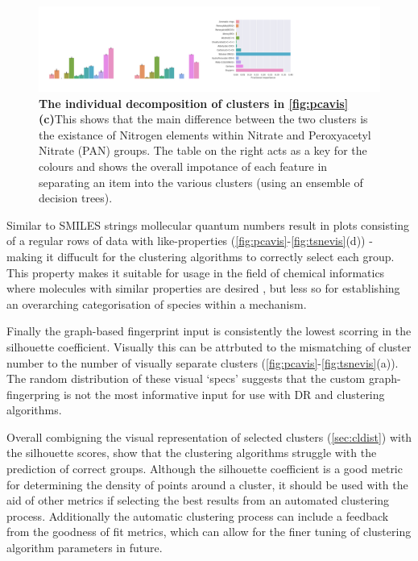\begin{figure}[H]
    \includegraphics[width=\textwidth]{outputs/PCA/maccs/group.png}
    \caption{\textbf{The individual decomposition of clusters in \autoref{fig:pcavis}(c)}This shows that the main difference between the two clusters is the existance of Nitrogen elements within Nitrate and Peroxyacetyl Nitrate (PAN) groups. The table on the right acts as a key for the colours and shows the overall impotance of each feature in separating an item into the various clusters (using an ensemble of decision trees).}
    \label{fig:maccsmath}
\end{figure}

Similar to SMILES strings mollecular quantum numbers result in plots consisting of a regular rows of data with like-properties (\autoref{fig:pcavis}-\ref{fig:tsnevis}(d)) - making it diffucult for the clustering algorithms to correctly select each group. This property makes it suitable for usage in the field of chemical informatics where molecules with similar properties are desired \citep{mqnpca}, but less so for establishing an overarching categorisation of species within a mechanism.

Finally the graph-based fingerprint input is consistently the lowest scorring in the silhouette coefficient. Visually this can be attrbuted to the mismatching of cluster number to the number of visually separate clusters  (\autoref{fig:pcavis}-\ref{fig:tsnevis}(a)). The random distribution of these visual `specs' suggests that the custom graph-fingerpring is not the most informative input for use with DR and clustering algorithms. 


Overall combigning the visual representation of selected clusters (\autoref{sec:cldist}) with the silhouette scores, show that the clustering algorithms struggle with the prediction of correct groups. Although the silhouette coefficient is a good metric for determining the density of points around a cluster, it should be used with the aid of other metrics if selecting the best results from an automated clustering process. Additionally the automatic clustering process can include a feedback from the goodness of fit metrics, which can allow for the finer tuning of clustering algorithm parameters in future. 


